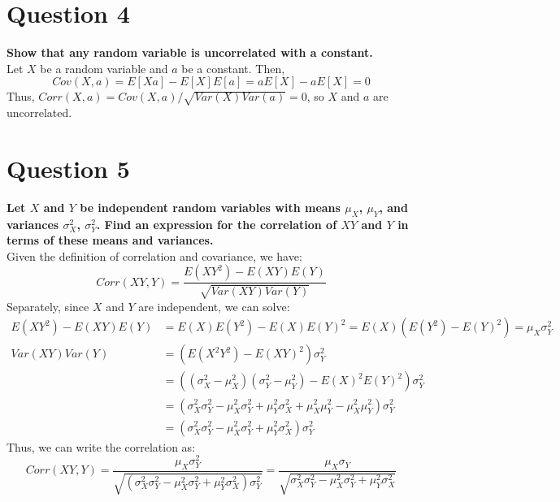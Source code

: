 \documentclass{article}
\begin{document}
\section*{Question 4}
\textbf{Show that any random variable is uncorrelated with a constant.}
\bigskip \\
Let $X$ be a random variable and $a$ be a constant. Then,
\[
	Cov(X,a) = E[Xa] - E[X]E[a] = aE[X] - aE[X] = 0
\]
Thus, $Corr(X,a) = Cov(X,a)/\sqrt{Var(X)Var(a)} = 0$, so $X$ and $a$ are uncorrelated.


\pagebreak
\section*{Question 5}
\textbf{Let $X$ and $Y$ be independent random variables with means $\mu_X$, $\mu_Y$, and variances $\sigma_X^2$, $\sigma^2_Y$. Find an expression for the correlation of $XY$ and $Y$ in terms of these means and variances.}
\bigskip \\
Given the definition of correlation and covariance, we have:
\[
	Corr(XY,Y) = \frac{E(XY^2)-E(XY)E(Y)}{\sqrt{Var(XY)Var(Y)}}
\]
Separately, since $X$ and $Y$ are independent, we can solve:
\begin{align*}
	E(XY^2)-E(XY)E(Y) 	&= E(X)E(Y^2) - E(X) E(Y)^2 = E(X)(E(Y^2) - E(Y)^2) = \mu_X\sigma_Y^2										\\
	Var(XY)Var(Y)		&= (E(X^2Y^2) - E(XY)^2)\sigma_Y^2 																			\\
						&= ((\sigma_X^2 - \mu_X^2)(\sigma_Y^2-\mu_Y^2) - E(X)^2E(Y)^2)\sigma_Y^2									\\
						&= (\sigma_X^2\sigma_Y^2 - \mu_X^2\sigma_Y^2+\mu_Y^2\sigma_X^2+\mu_X^2\mu_Y^2 - \mu_X^2\mu_Y^2)\sigma_Y^2	\\
						&= (\sigma_X^2\sigma_Y^2 - \mu_X^2\sigma_Y^2+\mu_Y^2\sigma_X^2)\sigma_Y^2
\end{align*}
Thus, we can write the correlation as:
\[
	Corr(XY,Y) 	= \frac{\mu_X\sigma_Y^2}{\sqrt{(\sigma_X^2\sigma_Y^2 - \mu_X^2\sigma_Y^2+\mu_Y^2\sigma_X^2)\sigma_Y^2}}
				= \frac{\mu_X\sigma_Y}{\sqrt{\sigma_X^2\sigma_Y^2 - \mu_X^2\sigma_Y^2+\mu_Y^2\sigma_X^2}}
\]

\end{document}

